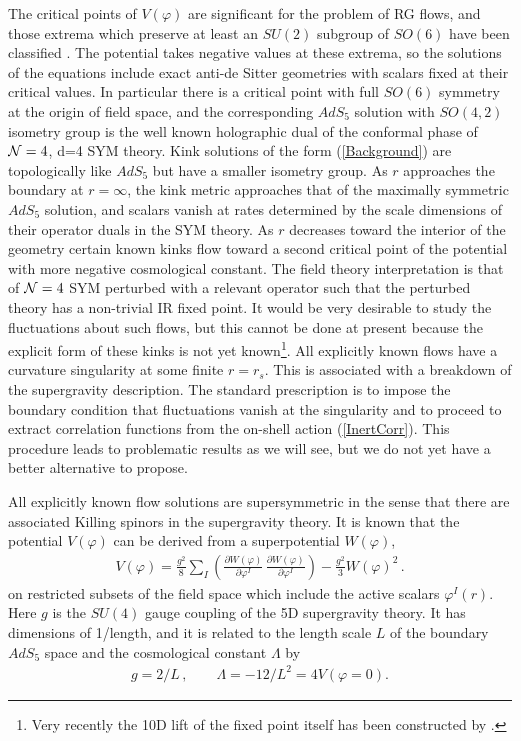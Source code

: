 \documentclass[a4paper,12pt]{article}
\begin{document}
The critical points of $V(\varphi)$ are significant for the problem of
 RG  flows, and  those  extrema  which preserve  at  least an  $SU(2)$
 subgroup of  $SO(6)$ have  been classified \cite{kpw}.  The potential
 takes  negative values  at these  extrema,  so the  solutions of  the
 equations include exact anti-de  Sitter geometries with scalars fixed
 at their  critical values.  In particular there  is a  critical point
 with  full $SO(6)$ symmetry  at the  origin of  field space,  and the
 corresponding $AdS_5$  solution with $SO(4,2)$ isometry  group is the
 well known holographic  dual of the conformal phase  of ${\cal N}=4$,
 d=4  SYM theory. Kink  solutions of  the form  (\ref{Background}) are
 topologically like $AdS_5$ but have  a smaller isometry group. As $r$
 approaches the  boundary at $r=  \infty$, the kink  metric approaches
 that of the maximally  symmetric $AdS_5$ solution, and scalars vanish
 at rates determined  by the scale dimensions of  their operator duals
 in  the SYM  theory.  As $r$  decreases  toward the  interior of  the
 geometry  certain  known  kinks  \cite{fgpw1} flow  toward  a  second
 critical  point  of the  potential  with  more negative  cosmological
 constant. The field theory interpretation is that of ${\cal N}=4$ SYM
 perturbed with a relevant operator such that the perturbed theory has
 a non-trivial IR fixed point. It would be very desirable to study the
 fluctuations about  such flows,  but this cannot  be done  at present
 because   the   explicit   form   of   these   kinks   is   not   yet
 known\footnote{Very recently  the 10D lift of the  fixed point itself
 has  been constructed by  \cite{pilchwarner}.}. All  explicitly known
 flows have  a curvature singularity  at some finite $r=r_s$.  This is
 associated  with a  breakdown of  the supergravity  description.  The
 standard  prescription  is  to  impose the  boundary  condition  that
 fluctuations  vanish at  the singularity  and to  proceed  to extract
 correlation      functions     from      the      on-shell     action
 (\ref{InertCorr}). This procedure leads  to problematic results as we
 will see, but we do not yet have a better alternative to propose.

All explicitly known flow solutions are supersymmetric in the sense
that there are associated Killing spinors in the supergravity
theory. It is known that the potential $V(\varphi)$ can be derived
from a superpotential $W(\varphi)$,
\begin{eqnarray}
\label{Superpot}
V(\varphi) = \frac{g^2}{8} \sum_I \left( \frac{\partial W(\varphi)}{\partial \varphi^I} \, \frac{\partial W(\varphi)}{\partial \varphi^I} \right) - \frac{g^2}{3} W(\varphi)^2 \,.
\end{eqnarray}
on restricted subsets of the field space which include the active
scalars $\varphi^I(r)$. Here $g$ is the $SU(4)$ gauge coupling of the
5D supergravity theory.  It has dimensions of 1/length, and it is
related to the length scale $L$ of the boundary $AdS_5$ space and the
cosmological constant $\Lambda$ by
\begin{eqnarray}
g= 2/L \,, \quad \quad    \Lambda=-12/L^2 = 4V(\varphi=0).
\end{eqnarray}
\end{document}
